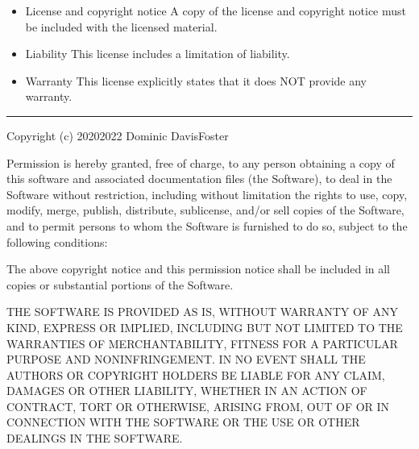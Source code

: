 \documentclass[letterpaper,10pt,english]{sphinxmanual}
\begin{document}
\vspace{10px}

\begin{itemize}
\item {}
License and copyright notice \textendash{} A copy of the license and copyright notice must be included with the licensed material.

\end{itemize}

\vspace{10px}

\begin{itemize}
\item {}
Liability \textendash{} This license includes a limitation of liability.

\item {}
Warranty \textendash{} This license explicitly states that it does NOT provide any warranty.

\end{itemize}

\begin{flushright}



\end{flushright}


\bigskip\hrule\bigskip




\begin{sphinxVerbatim}[commandchars=\\\{\}]
Copyright (c) 2020\PYGZhy{}2022 Dominic Davis\PYGZhy{}Foster

Permission is hereby granted, free of charge, to any person obtaining a copy
of this software and associated documentation files (the \PYGZdq{}Software\PYGZdq{}), to deal
in the Software without restriction, including without limitation the rights
to use, copy, modify, merge, publish, distribute, sublicense, and/or sell
copies of the Software, and to permit persons to whom the Software is
furnished to do so, subject to the following conditions:

The above copyright notice and this permission notice shall be included in all
copies or substantial portions of the Software.

THE SOFTWARE IS PROVIDED \PYGZdq{}AS IS\PYGZdq{}, WITHOUT WARRANTY OF ANY KIND,
EXPRESS OR IMPLIED, INCLUDING BUT NOT LIMITED TO THE WARRANTIES OF
MERCHANTABILITY, FITNESS FOR A PARTICULAR PURPOSE AND NONINFRINGEMENT.
IN NO EVENT SHALL THE AUTHORS OR COPYRIGHT HOLDERS BE LIABLE FOR ANY CLAIM,
DAMAGES OR OTHER LIABILITY, WHETHER IN AN ACTION OF CONTRACT, TORT OR
OTHERWISE, ARISING FROM, OUT OF OR IN CONNECTION WITH THE SOFTWARE OR THE USE
OR OTHER DEALINGS IN THE SOFTWARE.
\end{sphinxVerbatim}
\end{document}

